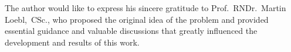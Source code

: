 The author would like to express his sincere gratitude to Prof.~RNDr.~Martin Loebl,~CSc., who proposed the original idea of the \MinCutPath{} problem and provided essential guidance and valuable discussions that greatly influenced the development and results of this work.

